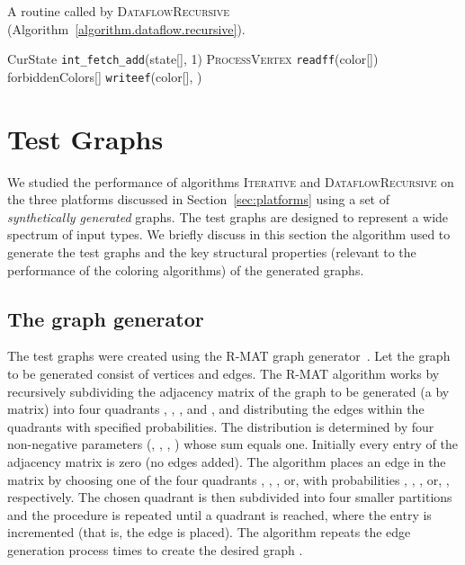 \documentclass{article}
\begin{document}
\begin{algorithm}[t]
\small
\caption{A routine called by \textsc{DataflowRecursive} (Algorithm~\ref{algorithm.dataflow.recursive}).}
\label{algorithm.process.vertex}
\begin{algorithmic}[1]
             \State CurState  \texttt{int\_fetch\_add}(\textsf{state}[], 1)
                \State \textsc{ProcessVertex} 
             \EndIf
             \State   \texttt{readff}(\textsf{color}[])
                  \label{processvertex-readff-line} 
          \State \textsf{forbiddenColors}[]   
   \EndFor
   \State      
   \State \texttt{writeef}(\textsf{color}[], ) 
\EndProcedure
\end{algorithmic}
\end{algorithm}


\section{Test Graphs}
\label{sec:graphs}

We studied the performance of algorithms \textsc{Iterative} and \textsc{DataflowRecursive}
on the three platforms discussed in Section~\ref{sec:platforms}
using a set of {\em synthetically generated} graphs.
The test graphs are designed to  represent a wide spectrum of input types. 
We briefly discuss in this section the algorithm used to 
generate the test graphs and the key structural properties 
(relevant to the performance of the coloring algorithms) 
of the generated graphs.

\subsection{The graph generator}

The test graphs were created using the R-MAT graph generator~\cite{Chakrabarti}.
Let the graph to be generated consist of  vertices and  edges.
The R-MAT algorithm works by recursively subdividing the adjacency matrix of the graph to 
be generated (a  by  matrix) into four quadrants , , , and
, and distributing the  edges within the quadrants with specified probabilities.
The distribution is determined by four non-negative parameters (, , , ) 
whose sum equals one. Initially every entry of the adjacency matrix is zero (no edges added).
The algorithm places an edge in the matrix by choosing one of the four quadrants
, , , or,  with probabilities , , , or, , respectively.
The chosen quadrant is then subdivided into four smaller partitions and the procedure is
repeated until a  quadrant is reached, where the entry is incremented 
(that is, the edge is placed).
The algorithm repeats the edge generation process  times to create the desired graph
.  
\end{document}
